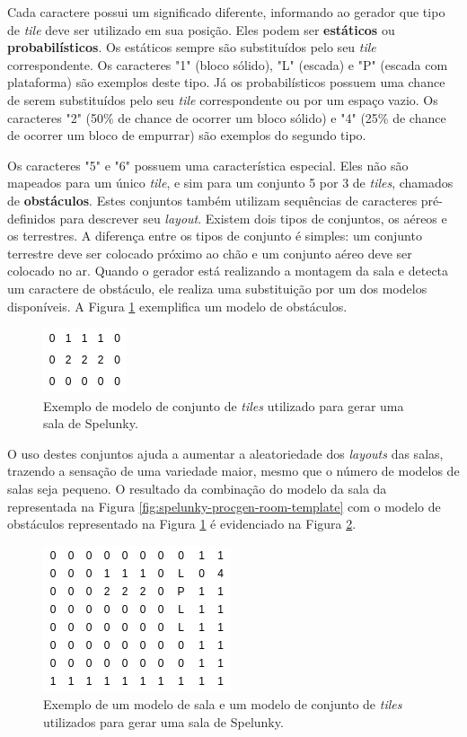 Cada caractere possui um significado diferente, informando ao gerador que tipo
de \textit{tile} deve ser utilizado em sua posição. Eles podem ser
\textbf{estáticos} ou \textbf{probabilísticos}. Os estáticos sempre são
substituídos pelo seu \textit{tile} correspondente. Os caracteres "1" (bloco
sólido), "L" (escada) e "P" (escada com plataforma) são exemplos deste tipo. Já
os probabilísticos possuem uma chance de serem substituídos pelo seu
\textit{tile} correspondente ou por um espaço vazio. Os caracteres "2" (50\% de
chance de ocorrer um bloco sólido) e "4" (25\% de chance de ocorrer um bloco de
empurrar) são exemplos do segundo tipo.

Os caracteres "5" e "6" possuem uma característica especial. Eles não são
mapeados para um único \textit{tile}, e sim para um conjunto 5 por 3 de
\textit{tiles}, chamados de \textbf{obstáculos}. Estes conjuntos também utilizam
sequências de caracteres pré-definidos para descrever seu \textit{layout}.
Existem dois tipos de conjuntos, os aéreos e os terrestres. A diferença entre os
tipos de conjunto é simples: um conjunto terrestre deve ser colocado próximo ao
chão e um conjunto aéreo deve ser colocado no ar. Quando o gerador está
realizando a montagem da sala e detecta um caractere de obstáculo, ele realiza
uma substituição por um dos modelos disponíveis. A Figura
\ref{fig:spelunky-procgen-room-chunk} exemplifica um modelo de obstáculos.

\begin{figure}[htb!]
\centering
\includegraphics[width=.15\textwidth]{fig/spelunky-procgen-room-chunk.png}
\caption{\label{fig:spelunky-procgen-room-chunk}Exemplo de modelo de conjunto de
\textit{tiles} utilizado para gerar uma sala de Spelunky.}
\end{figure}

O uso destes conjuntos ajuda a aumentar a aleatoriedade dos \textit{layouts} das
salas, trazendo a sensação de uma variedade maior, mesmo que o número de modelos
de salas seja pequeno. O resultado da combinação do modelo da sala da
representada na Figura \ref{fig:spelunky-procgen-room-template} com o modelo de
obstáculos representado na Figura \ref{fig:spelunky-procgen-room-chunk} é
evidenciado na Figura \ref{fig:spelunky-procgen-room-combination}.

\begin{figure}[htb!]
\centering
\includegraphics[width=.35\textwidth]{fig/spelunky-procgen-room-combination.png}
\caption{\label{fig:spelunky-procgen-room-combination}Exemplo de um modelo de
sala e um modelo de conjunto de \textit{tiles} utilizados para gerar uma sala de
Spelunky.}
\end{figure}

